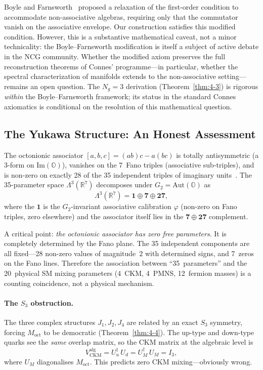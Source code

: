 Boyle and Farnsworth~\cite{ch4:BoyleFarnsworth2020} proposed a relaxation of the first-order condition to accommodate non-associative algebras, requiring only that the commutator vanish on the associative envelope. Our construction satisfies this modified condition. However, this is a substantive mathematical caveat, not a minor technicality: the Boyle--Farnsworth modification is itself a subject of active debate in the NCG community. Whether the modified axiom preserves the full reconstruction theorems of Connes' programme---in particular, whether the spectral characterization of manifolds extends to the non-associative setting---remains an open question. The $N_g = 3$ derivation (Theorem~\ref{thm:4-3}) is rigorous \emph{within} the Boyle--Farnsworth framework; its status in the standard Connes axiomatics is conditional on the resolution of this mathematical question.

\subsection{The Yukawa Structure: An Honest Assessment}
\label{sec:4-yukawa-assessment}

The octonionic associator $[a, b, c] = (ab)c - a(bc)$ is totally antisymmetric (a 3-form on $\mathrm{Im}(\mathbb{O})$), vanishes on the 7~Fano triples (associative sub-triples), and is non-zero on exactly 28 of the 35 independent triples of imaginary units~\cite{ch4:Baez2002}. The 35-parameter space $\Lambda^3(\mathbb{R}^7)$ decomposes under $G_2 = \mathrm{Aut}(\mathbb{O})$ as
\begin{equation}
  \Lambda^3(\mathbb{R}^7) = \mathbf{1} \oplus \mathbf{7} \oplus \mathbf{27},
  \label{eq:4-88}
\end{equation}
where the $\mathbf{1}$ is the $G_2$-invariant associative calibration $\varphi$ (non-zero on Fano triples, zero elsewhere) and the associator itself lies in the $\mathbf{7} \oplus \mathbf{27}$ complement.

A critical point: \emph{the octonionic associator has zero free parameters}. It is completely determined by the Fano plane. The 35 independent components are all fixed---28 non-zero values of magnitude~$2$ with determined signs, and 7~zeros on the Fano lines. Therefore the association between ``35~parameters'' and the 20~physical SM mixing parameters (4~CKM, 4~PMNS, 12~fermion masses) is a counting coincidence, not a physical mechanism.

\paragraph{The $S_3$ obstruction.}
\label{sec:4-s3-catastrophe}
The three complex structures $J_1, J_2, J_4$ are related by an exact $S_3$ symmetry, forcing $M_{\mathrm{oct}}$ to be democratic (Theorem~\ref{thm:4-4}). The up-type and down-type quarks see the \emph{same} overlap matrix, so the CKM matrix at the algebraic level is
\begin{equation}
  V_{\mathrm{CKM}}^{\mathrm{alg}} = U_u^\dagger\, U_d = U_M^\dagger\, U_M = I_3,
  \label{eq:4-89}
\end{equation}
where $U_M$ diagonalises $M_{\mathrm{oct}}$. This predicts zero CKM mixing---obviously wrong.

